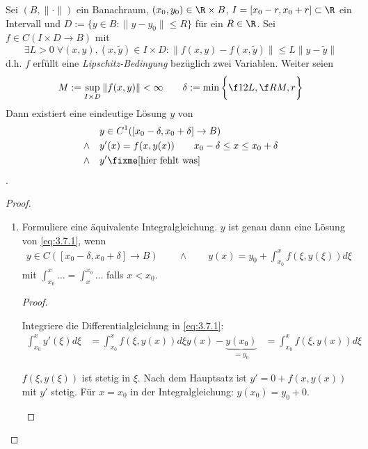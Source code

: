 \begin{st} \label{3.7}
	Sei $(B, \|\cdot\|)$ ein Banachraum, $(x_0,y_0) \in \R \times B$, $I=[x_0-r, x_0+r] \subset \R$ ein Intervall und $D := \{y \in B : \|y-y_0\| \le R\}$ für ein $R \in \R$.
	Sei $f \in C(I \times D \to B)$ mit
	\[
		\exists L > 0 \; \forall(x,y), (x,\tilde y) \in I \times D : \|f(x,y) - f(x,\tilde y) \| \le L\|y-\tilde y\|
	\]
	d.h. $f$ erfüllt eine \emph{Lipschitz-Bedingung} bezüglich zwei Variablen.
	Weiter seien
	\[
		M := \sup_{I \times D} \|f(x,y)\| < \infty
		\qquad
		\delta := \min \bigg\{ \f 1{2L}, \f RM, r \bigg\}
	\]
	Dann existiert eine eindeutige Lösung $y$ von
	\begin{align} \label{eq:3.7.1}
		&\quad y \in C^1([x_0 - \delta, x_0 + \delta] \to B) \\
		\land&\quad y'(x) = f(x,y(x)) \qquad x_0 - \delta \le x \le x_0 + \delta \\
		\land&\quad y' \fixme[\text{hier fehlt was}]
	\end{align}
	\fixme[Veranschaulichung falls $B = \R$, Zeichnung].
	\begin{proof}
		\begin{enumerate}[1)]
			\item
				Formuliere eine äquivalente Integralgleichung.
				$y$ ist genau dann eine Lösung von \eqref{eq:3.7.1}, wenn
				\begin{align} \label{eq:3.7.2}
					y \in C ( [x_0 - \delta, x_0 + \delta] \to B)
					\qquad \land \qquad
					y(x) = y_0 + \int_{x_0}^x f(\xi, y(\xi)) d\xi
				\end{align}
				mit $\int_{x_0}^{x} \dotso = \int_x^{x_0} \dotso$ falls $x < x_0$.
				\begin{proof}
					\begin{seg}
						Integriere die Differentialgleichung in \eqref{eq:3.7.1}:
						\begin{align*}
							\int_{x_0}^x y'(\xi) d\xi &= \int_{x_0}^x f(\xi, y(x)) d\xi
							y(x) - \underbrace{y(x_0)}_{=y_0} &= \int_{x_0}^x f(\xi, y(x)) d\xi
						\end{align*}
					\end{seg}
					\begin{seg}
						$f(\xi, y(\xi))$ ist stetig in $\xi$.
						Nach dem Hauptsatz ist $y' = 0 + f(x, y(x))$ mit $y'$ stetig.
						Für $x = x_0$ in der Integralgleichung: $y(x_0) = y_0 + 0$.


\end{seg}
\end{proof}
\end{enumerate}
\end{proof}
\end{st}
